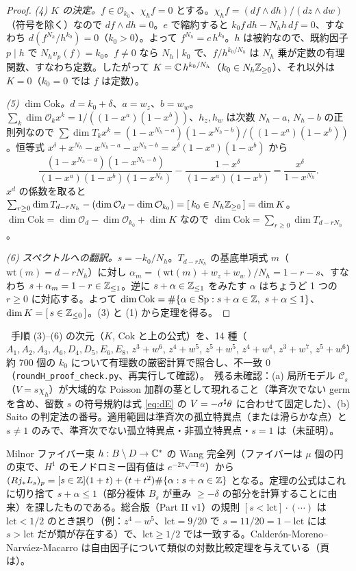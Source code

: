 \begin{proof}
\emph{(4) $K$ の決定。}$f\in\mathcal O_{k_0}$、$\chi_hf=0$ とする。$\chi_hf=(df\wedge dh)/(dz\wedge dw)$（符号を除く）なので $df\wedge dh=0$。$e$ で縮約すると $k_0f\,dh-N_hh\,df=0$、すなわち $d(f^{N_h}/h^{k_0})=0$（$k_0>0$）。よって $f^{N_h}=c\,h^{k_0}$。$h$ は被約なので、既約因子 $p\mid h$ で $N_hv_p(f)=k_0$。$f\ne0$ なら $N_h\mid k_0$ で、$f/h^{k_0/N_h}$ は $N_h$ 乗が定数の有理関数、すなわち定数。したがって $K=\mathbb C\,h^{k_0/N_h}$（$k_0\in N_h\mathbb Z_{\ge0}$）、それ以外は $K=0$（$k_0=0$ では $f$ は定数）。

\emph{(5) $\dim\mathrm{Cok}$。}$d=k_0+\delta$、$a=w_z$、$b=w_w$。$\sum_k\dim\mathcal O_kx^k=1/((1-x^a)(1-x^b))$、$h_z,h_w$ は次数 $N_h-a$, $N_h-b$ の正則列なので $\sum\dim T_kx^k=(1-x^{N_h-a})(1-x^{N_h-b})/((1-x^a)(1-x^b))$。恒等式 $x^\delta+x^{N_h}-x^{N_h-a}-x^{N_h-b}=x^\delta(1-x^a)(1-x^b)$ から
\[\frac{(1-x^{N_h-a})(1-x^{N_h-b})}{(1-x^a)(1-x^b)(1-x^{N_h})}-\frac{1-x^\delta}{(1-x^a)(1-x^b)}=\frac{x^\delta}{1-x^{N_h}}.\]
$x^d$ の係数を取ると $\sum_{r\ge0}\dim T_{d-rN_h}-(\dim\mathcal O_d-\dim\mathcal O_{k_0})=[\,k_0\in N_h\mathbb Z_{\ge0}\,]=\dim K$。$\dim\mathrm{Cok}=\dim\mathcal O_d-\dim\mathcal O_{k_0}+\dim K$ なので $\dim\mathrm{Cok}=\sum_{r\ge0}\dim T_{d-rN_h}$。

\emph{(6) スペクトルへの翻訳。}$s=-k_0/N_h$。$T_{d-rN_h}$ の基底単項式 $m$（$\mathrm{wt}(m)=d-rN_h$）に対し $\alpha_m=(\mathrm{wt}(m)+w_z+w_w)/N_h=1-r-s$、すなわち $s+\alpha_m=1-r\in\mathbb Z_{\le1}$。逆に $s+\alpha\in\mathbb Z_{\le1}$ をみたす $\alpha$ はちょうど 1 つの $r\ge0$ に対応する。よって $\dim\mathrm{Cok}=\#\{\alpha\in\mathrm{Sp}:s+\alpha\in\Z,\ s+\alpha\le1\}$、$\dim K=[\,s\in\mathbb Z_{\le0}\,]$。(3) と (1) から定理を得る。\qedhere
\end{proof}
\begin{rem}[状態と残る未確認事項]
\tV\ 手順 (3)--(6) の次元（$K$, $\mathrm{Cok}$ と上の公式）を、14 種（$A_1,A_2,A_3,A_6,D_4,D_5,E_6,E_8$, $z^3+w^6$, $z^4+w^5$, $z^5+w^5$, $z^4+w^4$, $z^3+w^7$, $z^5+w^6$）約 700 個の $k_0$ について有理数の厳密計算で照合し、不一致 0（\texttt{roundH\_proof\_check.py}、再実行して確認）。\tQ\ 残る未確認：(a) 局所モデル $\mathcal C_s$（$V=s\chi_h$）が大域的な Poisson 加群の茎として現れること（準斉次でない germ を含め、留数 $s$ の符号規約は式 \eqref{eq:dE} の $V=-\sigma^\sharp\theta$ に合わせて固定した）、(b) Saito の判定法の番号。適用範囲は準斉次の孤立特異点（または滑らかな点）と $s\ne1$ のみで、準斉次でない孤立特異点・非孤立特異点・$s=1$ は\tK（未証明）。
\end{rem}
\begin{rem}[解釈\ \tC\ \tK]
Milnor ファイバー束 $h:B\setminus D\to\mathbb C^*$ の Wang 完全列（ファイバーは $\mu$ 個の円の束で、$H^1$ のモノドロミー固有値は $e^{-2\pi\sqrt{-1}\alpha}$）から $(Rj_*L_s)_p=[s\in\mathbb Z](1+t)+(t+t^2)\#\{\alpha:s+\alpha\in\mathbb Z\}$ となる。定理の公式はこれに切り捨て $s+\alpha\le1$（部分複体 $B_s$ が重み $\ge-\delta$ の部分を計算することに由来）を課したものである。総合版（Part II v1）の規則 $[s<\mathrm{lct}]\cdot(\cdots)$ は $\mathrm{lct}<1/2$ のとき誤り（例：$z^4-w^5$、$\mathrm{lct}=9/20$ で $s=11/20=1-\mathrm{lct}$ には $s>\mathrm{lct}$ だが類が存在する）で、$\mathrm{lct}\ge1/2$ では一致する。Calder\'on-Moreno--Narv\'aez-Macarro \cite{CMNM} は自由因子について類似の対数比較定理を与えている（頁は\tQ）。
\end{rem}
